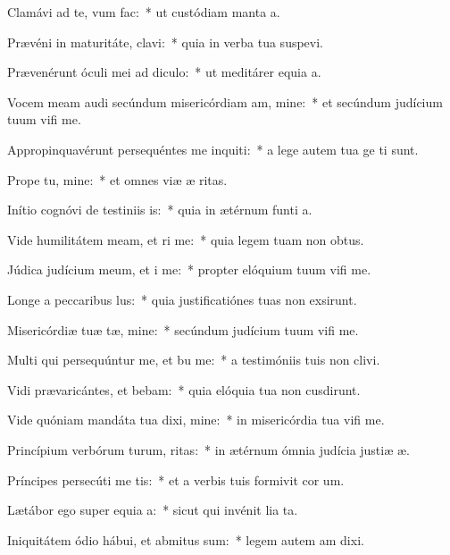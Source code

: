 \item Clamávi ad te, vum  fac:~* ut custódiam manta a.
\item Prævéni in maturitáte,  clavi:~* quia in verba tua suspevi.
\item Prævenérunt óculi mei ad  diculo:~* ut meditárer equia a.
\item Vocem meam audi secúndum misericórdiam am, mine:~* et secúndum judícium tuum vifi me.
\item Appropinquavérunt persequéntes me inquiti:~* a lege autem tua ge ti sunt.
\item Prope  tu, mine:~* et omnes viæ æ ritas.
\item Inítio cognóvi de testiniis is:~* quia in ætérnum funti a.
\item Vide humilitátem meam, et ri me:~* quia legem tuam non  obtus.
\item Júdica judícium meum, et i me:~* propter elóquium tuum vifi me.
\item Longe a peccaribus lus:~* quia justificatiónes tuas non exsirunt.
\item Misericórdiæ tuæ tæ, mine:~* secúndum judícium tuum vifi me.
\item Multi qui persequúntur me, et bu me:~* a testimóniis tuis non clivi.
\item Vidi prævaricántes, et bebam:~* quia elóquia tua non cusdirunt.
\item Vide quóniam mandáta tua dixi, mine:~* in misericórdia tua vifi me.
\item Princípium verbórum turum, ritas:~* in ætérnum ómnia judícia justiæ æ.
\item Príncipes persecúti  me tis:~* et a verbis tuis formivit cor um.
\item Lætábor ego super equia a:~* sicut qui invénit lia ta.
\item Iniquitátem ódio hábui, et abmitus sum:~* legem autem am dixi.
